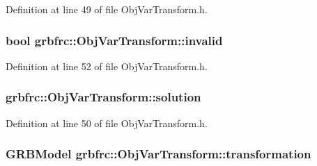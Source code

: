 Definition at line 49 of file Obj\+Var\+Transform.\+h.

\subsubsection[{\texorpdfstring{invalid}{invalid}}]{\setlength{\rightskip}{0pt plus 5cm}bool grbfrc\+::\+Obj\+Var\+Transform\+::invalid\hspace{0.3cm}{\ttfamily [private]}}\hypertarget{classgrbfrc_1_1ObjVarTransform_a4b4e95ad27dfd7b02b041725196e0be8}{}\label{classgrbfrc_1_1ObjVarTransform_a4b4e95ad27dfd7b02b041725196e0be8}


Definition at line 52 of file Obj\+Var\+Transform.\+h.

\subsubsection[{\texorpdfstring{solution}{solution}}]{ grbfrc\+::\+Obj\+Var\+Transform\+::solution\hspace{0.3cm}{\ttfamily [private]}}\hypertarget{classgrbfrc_1_1ObjVarTransform_a9b0edd0806a1ad567dc0ea75b815a6d0}{}\label{classgrbfrc_1_1ObjVarTransform_a9b0edd0806a1ad567dc0ea75b815a6d0}


Definition at line 50 of file Obj\+Var\+Transform.\+h.

\subsubsection[{\texorpdfstring{transformation}{transformation}}]{\setlength{\rightskip}{0pt plus 5cm}G\+R\+B\+Model grbfrc\+::\+Obj\+Var\+Transform\+::transformation\hspace{0.3cm}{\ttfamily [private]}}\hypertarget{classgrbfrc_1_1ObjVarTransform_a97ea0a63c0b947d4dbdd417e543f88c2}{}\label{classgrbfrc_1_1ObjVarTransform_a97ea0a63c0b947d4dbdd417e543f88c2}


